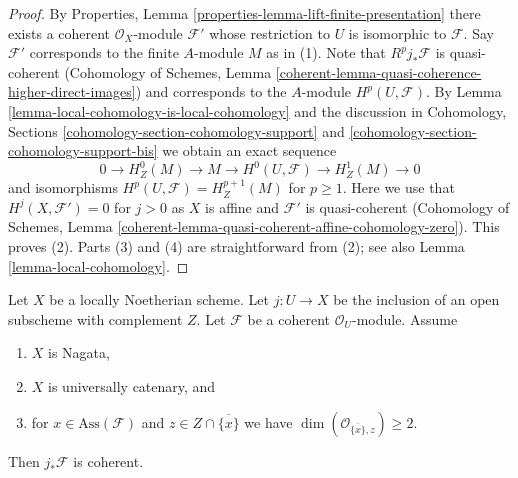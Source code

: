 \begin{proof}
By Properties, Lemma \ref{properties-lemma-lift-finite-presentation}
there exists a coherent $\mathcal{O}_X$-module $\mathcal{F}'$
whose restriction to $U$ is isomorphic to $\mathcal{F}$.
Say $\mathcal{F}'$ corresponds to the finite $A$-module $M$
as in (1).
Note that $R^pj_*\mathcal{F}$ is quasi-coherent
(Cohomology of Schemes, Lemma
\ref{coherent-lemma-quasi-coherence-higher-direct-images})
and corresponds to the $A$-module $H^p(U, \mathcal{F})$.
By Lemma \ref{lemma-local-cohomology-is-local-cohomology}
and the discussion in
Cohomology, Sections \ref{cohomology-section-cohomology-support} and
\ref{cohomology-section-cohomology-support-bis}
we obtain an exact sequence
$$
0 \to H^0_Z(M) \to M \to H^0(U, \mathcal{F}) \to H^1_Z(M) \to 0
$$
and isomorphisms $H^p(U, \mathcal{F}) = H^{p + 1}_Z(M)$ for $p \geq 1$.
Here we use that $H^j(X, \mathcal{F}') = 0$ for $j > 0$ as $X$ is affine
and $\mathcal{F}'$ is quasi-coherent (Cohomology of Schemes,
Lemma \ref{coherent-lemma-quasi-coherent-affine-cohomology-zero}).
This proves (2).
Parts (3) and (4) are straightforward from (2); see also
Lemma \ref{lemma-local-cohomology}.
\end{proof}

\begin{lemma}
\label{lemma-finiteness-pushforward}
Let $X$ be a locally Noetherian scheme.
Let $j : U \to X$ be the inclusion of an
open subscheme with complement $Z$. Let $\mathcal{F}$ be a coherent
$\mathcal{O}_U$-module. Assume
\begin{enumerate}
\item $X$ is Nagata,
\item $X$ is universally catenary, and
\item for $x \in \text{Ass}(\mathcal{F})$ and
$z \in Z \cap \overline{\{x\}}$ we have
$\dim(\mathcal{O}_{\overline{\{x\}}, z}) \geq 2$.
\end{enumerate}
Then $j_*\mathcal{F}$ is coherent.
\end{lemma}

